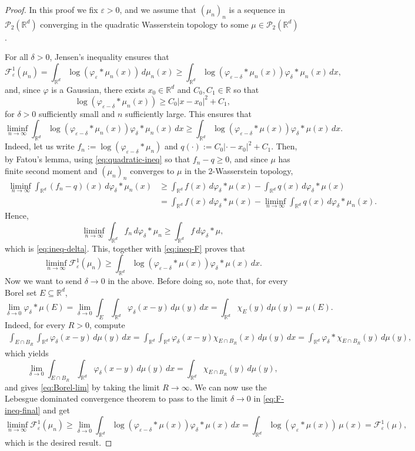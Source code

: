 \documentclass[11pt,leqno]{amsart}
\theoremstyle{definition}
\newcommand{\be}{\begin{equation}}
\newcommand{\ee}{\end{equation}}
\newcommand{\bes}{\begin{equation*}}
\newcommand{\ees}{\end{equation*}}
\newcommand{\R}{{\mathord{\mathbb R}}}
\newcommand{\F}{\mathcal{F}}
\def\P{{\mathcal P}}
\def\e{\varepsilon}
\newcommand{\ird}{\int_{\mathord{\mathbb R}^d}}
\def\F{\mathcal{F}}
\begin{document}
\begin{proof}
	In this proof we fix $\e >0$, and we assume that $(\mu_n)_n$ is a sequence in $\P_2(\R^d)$ converging in the quadratic Wasserstein topology to some $\mu\in\P_2(\R^d)$. 
	
	For all $\delta >0$, Jensen's inequality ensures that
\be \label{eq:ineq-F}
	\F^1_\e(\mu_n) = \ird \log(\varphi_\e* \mu_n(x)) \,d\mu_n(x) \geq \ird \log(\varphi_{\e-\delta} *\mu_n(x)) \varphi_\delta*\mu_n(x) \,dx,
\ee
and, since $\varphi$ is a Gaussian, there exists $x_0\in\R^d$ and $C_0,C_1\in\R$ so that 
\be\label{eq:quadratic-ineq}
	\log(\varphi_{\e-\delta}*\mu_n(x)) \geq C_0|x-x_0|^2 + C_1,
\ee
for $\delta>0$ sufficiently small and $n$ sufficiently large. This ensures that
\be\label{eq:ineq-delta}
	\liminf_{n\to\infty} \ird \log(\varphi_{\e-\delta}* \mu_n(x)) \varphi_\delta*\mu_n(x)\,dx \geq \ird \log(\varphi_{\e-\delta}*\mu(x)) \varphi_{\delta}*\mu(x)\,dx.
\ee
Indeed, let us write $f_n:= \log(\varphi_{\e-\delta}* \mu_n)$ and $q(\cdot):= C_0|\cdot-x_0|^2 + C_1$. Then, by Fatou's lemma, using \eqref{eq:quadratic-ineq} so that $f_n-q\geq0$, and since $\mu$ has finite second moment and $(\mu_n)_n$ converges to $\mu$ in the $2$-Wasserstein topology, 
\begin{align*}
	\liminf_{n\to\infty} \ird (f_n - q)(x) \,d\varphi_\delta*\mu_n(x) &\geq \ird f(x) \,d\varphi_\delta*\mu(x) - \ird q(x) \,d\varphi_\delta*\mu(x)\\
	&= \ird f(x) \,d\varphi_\delta*\mu(x) - \liminf_{n\to\infty}\ird q(x) \,d\varphi_\delta*\mu_n(x).
\end{align*}
Hence,
\bes
	\liminf_{n\to\infty} \ird f_n \,d\varphi_\delta*\mu_n \geq \ird f \,d\varphi_\delta*\mu,
\ees
which is \eqref{eq:ineq-delta}. This, together with \eqref{eq:ineq-F} proves that
\be\label{eq:ineq-F-final}
	\liminf_{n\to\infty} \F^1_\e(\mu_n) \geq \ird \log(\varphi_{\e-\delta}*\mu(x)) \varphi_{\delta}*\mu(x)\,dx.
\ee
Now we want to send $\delta\to0$ in the above. Before doing so, note that, for every Borel set $E\subseteq \R^d$,
\be\label{eq:Borel-lim}
	\lim_{\delta\to0} \varphi_\delta *\mu(E) = \lim_{\delta\to0} \int_{E} \ird \varphi_\delta(x-y) \,d\mu(y) \,dx = \ird \chi_{E}(y) \,d\mu(y) = \mu(E).
\ee
Indeed, for every $R>0$, compute
\begin{align*}
	\int_{E\cap B_R} \ird \varphi_\delta(x-y) \,d\mu(y) \,dx = \ird \ird \varphi_\delta(x-y) \chi_{E\cap B_R}(x) \,d\mu(y) \,dx = \ird \varphi_\delta * \chi_{E\cap B_R}(y) \,d\mu(y),
\end{align*}
which yields
\bes
	\lim_{\delta\to0} \int_{E\cap B_R} \ird \varphi_\delta(x-y) \,d\mu(y) \,dx = \ird \chi_{E\cap B_R}(y) \,d\mu(y),
\ees 
and gives \eqref{eq:Borel-lim} by taking the limit $R\to\infty$. We can now use the Lebesgue dominated convergence theorem to pass to the limit $\delta\to0$ in \eqref{eq:F-ineq-final} and get
\bes
	\liminf_{n\to\infty} \F^1_\e(\mu_n) \geq \lim_{\delta\to0} \ird \log(\varphi_{\e-\delta}*\mu(x)) \varphi_{\delta}*\mu(x)\,dx = \ird \log(\varphi_\e*\mu(x)) \,\mu(x) = \F^1_\e(\mu),
\ees
which is the desired result.
\end{proof}
\end{document}
